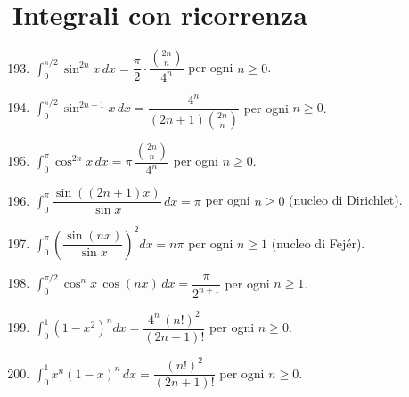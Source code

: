 \documentclass[11pt,a4paper]{article}
\begin{document}
\section*{Integrali con ricorrenza}
\begin{enumerate}
\setcounter{enumi}{192}
\item $\displaystyle\int_0^{\pi/2}\sin^{2n}x\,dx=\dfrac{\pi}{2}\cdot\dfrac{\binom{2n}{n}}{4^n}$ per ogni $n\ge0$.
\item $\displaystyle\int_0^{\pi/2}\sin^{2n+1}x\,dx=\dfrac{4^n}{(2n+1)\binom{2n}{n}}$ per ogni $n\ge0$.
\item $\displaystyle\int_0^{\pi}\cos^{2n}x\,dx=\pi\,\dfrac{\binom{2n}{n}}{4^n}$ per ogni $n\ge0$.
\item $\displaystyle\int_0^{\pi}\dfrac{\sin\left((2n+1)x\right)}{\sin x}\,dx=\pi$ per ogni $n\ge0$ (nucleo di Dirichlet).
\item $\displaystyle\int_0^{\pi}\left(\dfrac{\sin(nx)}{\sin x}\right)^2dx=n\pi$ per ogni $n\ge1$ (nucleo di Fejér).
\item $\displaystyle\int_0^{\pi/2}\cos^n x\,\cos(nx)\,dx=\dfrac{\pi}{2^{n+1}}$ per ogni $n\ge1$.
\item $\displaystyle\int_0^{1}\left(1-x^2\right)^n dx=\dfrac{4^n\,(n!)^2}{(2n+1)!}$ per ogni $n\ge0$.
\item $\displaystyle\int_0^{1}x^n(1-x)^n\,dx=\dfrac{(n!)^2}{(2n+1)!}$ per ogni $n\ge0$.
\end{enumerate}
\end{document}
